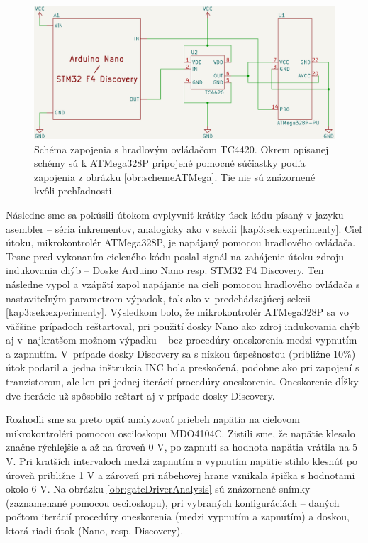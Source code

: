 \begin{figure}
    \centerline{\includegraphics[width=1\textwidth]{images/schemeGateDriver.png}}
    \caption[Schéma zapojenia s hradlovým ovládačom TC4420]{Schéma zapojenia s hradlovým ovládačom TC4420. Okrem opísanej schémy sú k ATMega328P pripojené pomocné súčiastky podľa zapojenia z obrázku \ref{obr:schemeATMega}. Tie nie sú znázornené kvôli prehľadnosti.}
    \label{obr:schemeGateDriver}
\end{figure}

Následne sme sa pokúsili útokom ovplyvniť krátky úsek kódu písaný v jazyku asembler -- séria inkrementov, analogicky ako v sekcii \ref{kap3:sek:experimenty}. Cieľ útoku, mikrokontrolér ATMega328P, je napájaný pomocou hradlového ovládača. Tesne pred vykonaním cieleného kódu poslal signál na zahájenie útoku zdroju indukovania chýb -- Doske Arduino Nano resp. STM32 F4 Discovery. Ten následne vypol a vzápätí zapol napájanie na cieli pomocou hradlového ovládača s nastaviteľným parametrom výpadok, tak ako v~predchádzajúcej sekcii \ref{kap3:sek:experimenty}. Výsledkom bolo, že mikrokontrolér ATMega328P sa vo väčšine prípadoch reštartoval, pri použití dosky Nano ako zdroj indukovania chýb aj v~najkratšom možnom výpadku -- bez procedúry oneskorenia medzi vypnutím a zapnutím. V~prípade dosky Discovery sa s nízkou úspešnosťou (približne 10\%) útok podaril a~jedna inštrukcia INC bola preskočená, podobne ako pri zapojení s tranzistorom, ale len pri jednej iterácií procedúry oneskorenia. Oneskorenie dĺžky dve iterácie už spôsobilo reštart aj v prípade dosky Discovery.

Rozhodli sme sa preto opäť analyzovať priebeh napätia na cieľovom mikrokontroléri pomocou osciloskopu MDO4104C. Zistili sme, že napätie klesalo značne rýchlejšie a až na úroveň 0 V, po zapnutí sa hodnota napätia vrátila na 5 V. Pri kratších intervaloch medzi zapnutím a vypnutím napätie stihlo klesnúť po úroveň približne 1 V a zároveň pri nábehovej hrane vznikala špička s hodnotami okolo 6 V. Na obrázku \ref{obr:gateDriverAnalysis} sú znázornené snímky (zaznamenané pomocou osciloskopu), pri vybraných konfiguráciách -- daných počtom iterácií procedúry oneskorenia (medzi vypnutím a zapnutím) a doskou, ktorá riadi útok (Nano, resp. Discovery).

